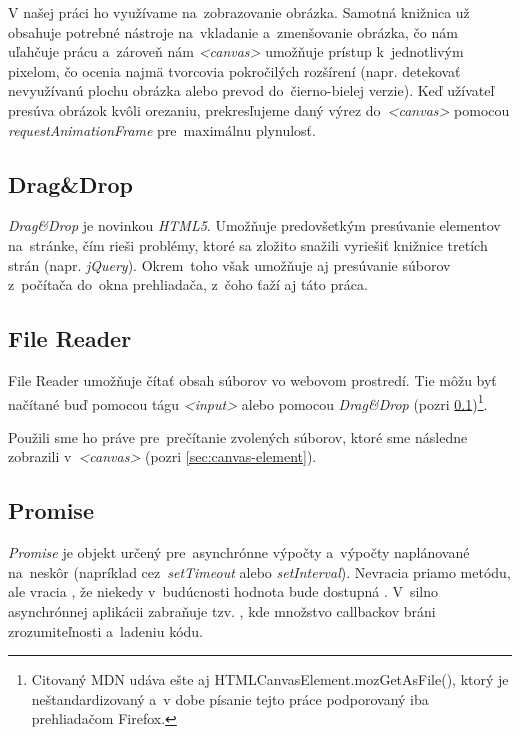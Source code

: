 V našej práci ho využívame na~zobrazovanie obrázka. Samotná knižnica už obsahuje potrebné nástroje na~vkladanie a~zmenšovanie obrázka, čo nám uľahčuje prácu a~zároveň nám \emph{<canvas>} umožňuje prístup k~jednotlivým pixelom, čo ocenia najmä tvorcovia pokročilých rozšírení (napr. detekovať nevyužívanú plochu obrázka alebo prevod do~čierno-bielej verzie). Keď užívateľ presúva obrázok kvôli orezaniu, prekresľujeme daný výrez do~\emph{<canvas>} pomocou \emph{requestAnimationFrame}\cite{MDN_RequestAnimationFrame} pre~maximálnu plynulosť.

\subsection{Drag\&Drop}
\label{sec:drag-n-drop}

\emph{Drag\&Drop} je novinkou \emph{HTML5}. Umožňuje predovšetkým presúvanie elementov na~stránke, čím rieši problémy, ktoré sa zložito snažili vyriešiť knižnice tretích strán (napr. \emph{jQuery}). Okrem~toho však umožňuje aj presúvanie súborov z~počítača do~okna prehliadača, z~čoho ťaží aj táto práca.

\subsection{File Reader}
\label{sec:file-reader}

File Reader umožňuje čítať obsah súborov vo webovom prostredí. Tie môžu byť načítané buď pomocou tágu \emph{<input>} alebo pomocou \emph{Drag\&Drop} (pozri \ref{sec:drag-n-drop})\cite{MDN_FileReader}\footnote{Citovaný MDN udáva ešte aj HTMLCanvasElement.mozGetAsFile(), ktorý je neštandardizovaný a~v dobe písanie tejto práce podporovaný iba prehliadačom Firefox.}.

Použili sme ho práve pre~prečítanie zvolených súborov, ktoré sme následne zobrazili v~\emph{<canvas>} (pozri \ref{sec:canvas-element}).

\subsection{Promise}

\emph{Promise} je objekt určený pre~asynchrónne výpočty a~výpočty naplánované na~neskôr (napríklad cez~\emph{setTimeout} alebo \emph{setInterval}). Nevracia priamo metódu, ale vracia , že niekedy v~budúcnosti hodnota bude dostupná \cite{MDN_Promise}. V~silno asynchrónnej aplikácii zabraňuje tzv. , kde množstvo callbackov bráni zrozumiteľnosti a~ladeniu kódu.

